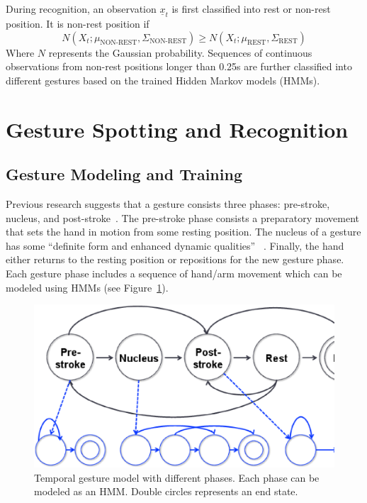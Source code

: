 \documentclass{acm_proc_article-sp}
\begin{document}
During recognition, an observation $\underline{x}_t$ is first classified into 
rest or non-rest position. It is non-rest position if 
\begin{displaymath}
N(X_t; \mu_{\text{NON-REST}}, \Sigma_{\text{NON-REST}}) \geq N(X_t; \mu_{\text{REST}}, \Sigma_{\text{REST}})
\end{displaymath}
Where $N$ represents the Gaussian probability. Sequences of continuous observations from non-rest
positions longer than 0.25s are further classified into different gestures based on the trained Hidden Markov models (HMMs).
 
\section{Gesture Spotting and Recognition}
\subsection{Gesture Modeling and Training}
Previous research suggests that
a gesture consists three phases: pre-stroke, nucleus, and post-stroke~\cite{Pavlovic97}. The pre-stroke phase consists
 a preparatory movement that sets the hand in motion from some resting position.
The nucleus of a gesture has some ``definite form and enhanced dynamic qualities''
~\cite{kendon86}. Finally, the hand either returns to the resting position or repositions
for the new gesture phase. Each gesture
phase includes a sequence of hand/arm movement which can be modeled using HMMs (see Figure~\ref{fig:hmm}). 

\begin{figure}[tb]
\centering
\includegraphics[trim={3cm 3cm 3cm 0.5cm}, clip, width=1\columnwidth]{fig/hmm.ps}
\caption{Temporal gesture model with different phases. Each phase can be modeled as an HMM. Double circles
represents an end state.}
\label{fig:hmm}
\end{figure}
\end{document}
